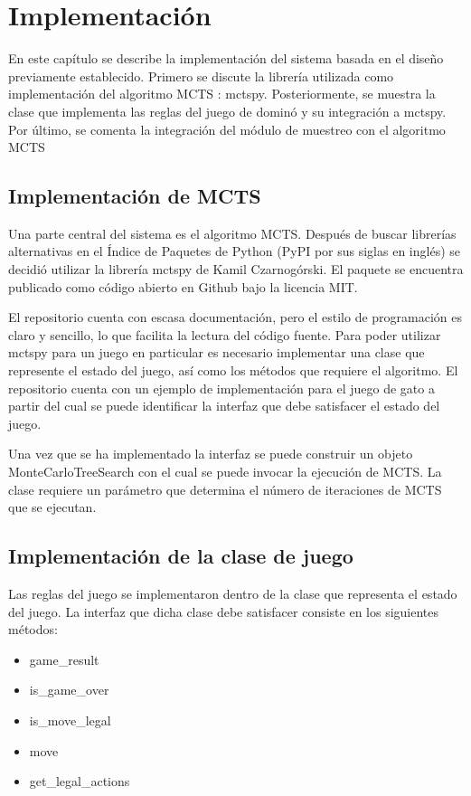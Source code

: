 \chapter{Implementación}

\noindent

En este capítulo se describe la implementación del sistema basada en el diseño
previamente establecido. Primero se discute la librería utilizada como
implementación del algoritmo MCTS : mctspy. Posteriormente, se muestra la clase
que implementa las reglas del juego de dominó y su integración a mctspy. Por
último, se comenta la integración del módulo de muestreo con el algoritmo MCTS

\section{Implementación de MCTS}

Una parte central del sistema es el algoritmo MCTS. Después de buscar librerías
alternativas en el Índice de Paquetes de Python (PyPI por sus siglas en inglés)
se decidió utilizar la librería mctspy de Kamil Czarnogórski. El paquete se
encuentra publicado como código abierto en Github bajo la licencia MIT.

El repositorio cuenta con escasa documentación, pero el estilo de programación
es claro y sencillo, lo que facilita la lectura del código fuente. Para poder
utilizar mctspy para un juego en particular es necesario implementar una clase
que represente el estado del juego, así como los métodos que requiere el
algoritmo. El repositorio cuenta con un ejemplo de implementación para el juego
de gato a partir del cual se puede identificar la interfaz que debe satisfacer
el estado del juego.

Una vez que se ha implementado la interfaz se puede construir un objeto
MonteCarloTreeSearch con el cual se puede invocar la ejecución de MCTS. La clase
requiere un parámetro que determina el número de iteraciones de MCTS que se
ejecutan.

\section{Implementación de la clase de juego}

Las reglas del juego se implementaron dentro de la clase que representa el
estado del juego. La interfaz que dicha clase debe satisfacer consiste en los
siguientes métodos:

\begin{itemize}
   \item game\_result
   \item is\_game\_over
   \item is\_move\_legal
   \item move
   \item get\_legal\_actions
\end{itemize}

